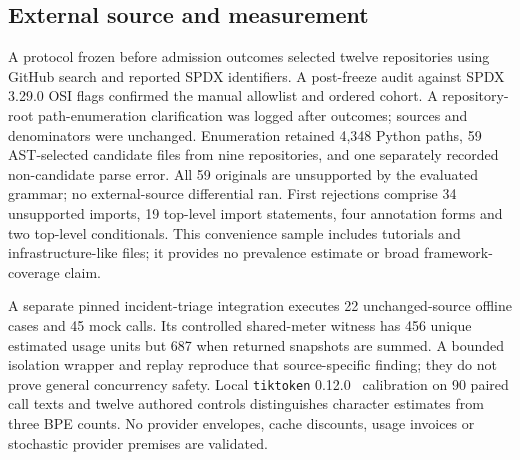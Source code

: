 \documentclass[preprint,12pt,a4paper]{elsarticle}
\begin{document}
\subsection{External source and measurement}
A protocol frozen before admission outcomes selected twelve repositories using GitHub search and reported SPDX identifiers. A post-freeze audit against SPDX 3.29.0 OSI flags confirmed the manual allowlist and ordered cohort. A repository-root path-enumeration clarification was logged after outcomes; sources and denominators were unchanged. Enumeration retained 4,348 Python paths, 59 AST-selected candidate files from nine repositories, and one separately recorded non-candidate parse error. All 59 originals are unsupported by the evaluated grammar; no external-source differential ran. First rejections comprise 34 unsupported imports, 19 top-level import statements, four annotation forms and two top-level conditionals. This convenience sample includes tutorials and infrastructure-like files; it provides no prevalence estimate or broad framework-coverage claim.

A separate pinned incident-triage integration executes 22 unchanged-source offline cases and 45 mock calls. Its controlled shared-meter witness has 456 unique estimated usage units but 687 when returned snapshots are summed. A bounded isolation wrapper and replay reproduce that source-specific finding; they do not prove general concurrency safety. Local \texttt{tiktoken} 0.12.0~\cite{tiktoken} calibration on 90 paired call texts and twelve authored controls distinguishes character estimates from three BPE counts. No provider envelopes, cache discounts, usage invoices or stochastic provider premises are validated.
\end{document}
